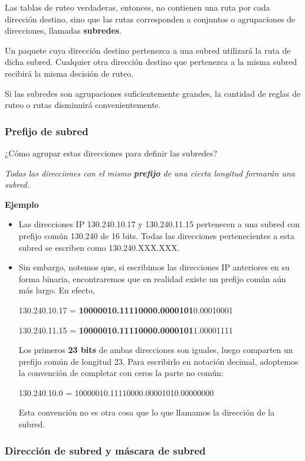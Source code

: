 \documentclass[spanish,a4paper,]{article}
\begin{document}
Las tablas de ruteo verdaderas, entonces, no contienen una ruta por cada
dirección destino, sino que las rutas corresponden a conjuntos o
agrupaciones de direcciones, llamadas \textbf{subredes}.

Un paquete cuya dirección destino pertenezca a una subred utilizará la
ruta de dicha subred. Cualquier otra dirección destino que pertenezca a
la misma subred recibirá la misma decisión de ruteo.

Si las subredes son agrupaciones suficientemente grandes, la cantidad de
reglas de ruteo o rutas disminuirá convenientemente.

\hypertarget{prefijo-de-subred}{%
\subsubsection{Prefijo de subred}\label{prefijo-de-subred}}

¿Cómo agrupar estas direcciones para definir las subredes?

\emph{Todas las direcciones con el mismo \textbf{prefijo} de una cierta
longitud formarán una subred.}

\textbf{Ejemplo}

\begin{itemize}
\item
  Las direcciones IP 130.240.10.17 y 130.240.11.15 pertenecen a una
  subred con prefijo común 130.240 de 16 bits. Todas las direcciones
  pertenecientes a esta subred se escriben como 130.240.XXX.XXX.
\item
  Sin embargo, notemos que, si escribimos las direcciones IP anteriores
  en su forma binaria, encontraremos que en realidad existe un prefijo
  común aún más largo. En efecto,

  130.240.10.17 = \textbf{10000010.11110000.0000101}0.00010001

  130.240.11.15 = \textbf{10000010.11110000.0000101}1.00001111

  Los primeros \textbf{23 bits} de ambas direcciones son iguales, luego
  comparten un prefijo común de longitud 23. Para escribirlo en notación
  decimal, adoptemos la convención de completar con ceros la parte no
  común:

  130.240.10.0 = 10000010.11110000.00001010.00000000

  Esta convención no es otra cosa que lo que llamamos la dirección de la
  subred.
\end{itemize}

\hypertarget{direcciuxf3n-de-subred-y-muxe1scara-de-subred}{%
\subsubsection{Dirección de subred y máscara de
subred}\label{direcciuxf3n-de-subred-y-muxe1scara-de-subred}}
\end{document}
